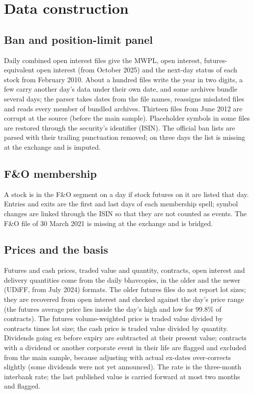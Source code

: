 \chapter{Data construction}\label{app:data}

\section{Ban and position-limit panel}
Daily combined open interest files give the MWPL, open interest, futures-equivalent open interest (from October 2025) and
the next-day status of each stock from February 2010. About a hundred files write the year in two digits, a few carry
another day's data under their own date, and some archives bundle several days; the parser takes dates from the file
names, reassigns misdated files and reads every member of bundled archives. Thirteen files from June 2012 are corrupt at
the source (before the main sample). Placeholder symbols in some files are restored through the security's identifier
(ISIN). The official ban lists are parsed with their trailing punctuation removed; on three days the list is missing at the
exchange and is imputed.

\section{F\&O membership}
A stock is in the F\&O segment on a day if stock futures on it are listed that day. Entries and exits are the first and last
days of each membership spell; symbol changes are linked through the ISIN so that they are not counted as events. The F\&O
file of 30 March 2021 is missing at the exchange and is bridged.

\section{Prices and the basis}
Futures and cash prices, traded value and quantity, contracts, open interest and delivery quantities come from the daily
bhavcopies, in the older and the newer (UDiFF, from July 2024) formats. The older futures files do not report lot sizes;
they are recovered from open interest and checked against the day's price range (the futures average price lies inside
the day's high and low for 99.8\% of contracts). The futures volume-weighted price is traded value divided by contracts
times lot size; the cash price is traded value divided by quantity. Dividends going ex before expiry are subtracted at
their present value; contracts with a dividend or another corporate event in their life are flagged and excluded from the
main sample, because adjusting with actual ex-dates over-corrects slightly (some dividends were not yet announced). The
rate is the three-month interbank rate; the last published value is carried forward at most two months and flagged.

